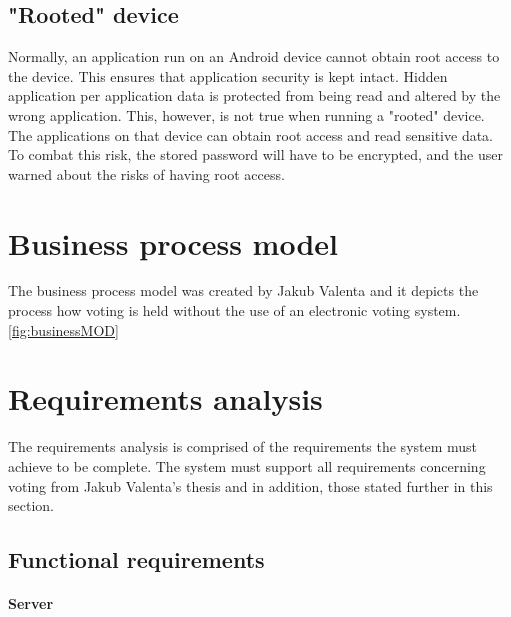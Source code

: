 \documentclass[11pt,twoside,a4paper]{book}
\begin{document}
\subsection{"Rooted" device}
Normally, an application run on an Android device cannot obtain root access to the device. This ensures that application security is kept intact. Hidden application per application data is protected from being read and altered by the wrong application. This, however, is not true when running a "rooted" device. The applications on that device can obtain root access and read sensitive data. To combat this risk, the stored password will have to be encrypted, and the user warned about the risks of having root access.


\section{Business process model}
The business process model was created by Jakub Valenta and it depicts the process how voting is held without the use of an electronic voting system. \cite{bakalarkaJV} \ref{fig:businessMOD}

\section{Requirements analysis}
The requirements analysis is comprised of the requirements the system must achieve to be complete. The system must support all requirements concerning voting from Jakub Valenta's thesis and in addition, those stated further in this section.
\subsection{Functional requirements}
\paragraph*{Server}
\end{document}
